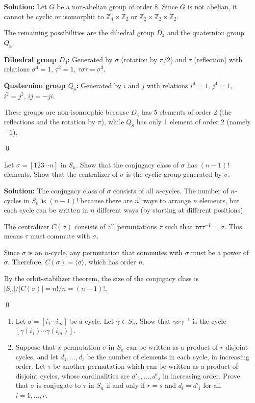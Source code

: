 \noindent\textbf{Solution:} Let $G$ be a non-abelian group of order 8. Since $G$ is not abelian, it cannot be cyclic or isomorphic to $\mathbb{Z}_4 \times \mathbb{Z}_2$ or $\mathbb{Z}_2 \times \mathbb{Z}_2 \times \mathbb{Z}_2$.

The remaining possibilities are the dihedral group $D_4$ and the quaternion group $Q_8$.

\textbf{Dihedral group $D_4$:} Generated by $\sigma$ (rotation by $\pi/2$) and $\tau$ (reflection) with relations $\sigma^4 = 1$, $\tau^2 = 1$, $\tau\sigma\tau = \sigma^3$.

\textbf{Quaternion group $Q_8$:} Generated by $i$ and $j$ with relations $i^4 = 1$, $j^4 = 1$, $i^2 = j^2$, $ij = -ji$.

These groups are non-isomorphic because $D_4$ has 5 elements of order 2 (the reflections and the rotation by $\pi$), while $Q_8$ has only 1 element of order 2 (namely $-1$).


\qed
\begin{problembox}
Let $\sigma = [123 \cdots n]$ in $S_n$. Show that the conjugacy class of $\sigma$ has $(n - 1)!$ elements. Show that the centralizer of $\sigma$ is the cyclic group generated by $\sigma$.
\end{problembox}

\noindent\textbf{Solution:} The conjugacy class of $\sigma$ consists of all $n$-cycles. The number of $n$-cycles in $S_n$ is $(n-1)!$ because there are $n!$ ways to arrange $n$ elements, but each cycle can be written in $n$ different ways (by starting at different positions).

The centralizer $C(\sigma)$ consists of all permutations $\tau$ such that $\tau\sigma\tau^{-1} = \sigma$. This means $\tau$ must commute with $\sigma$.

Since $\sigma$ is an $n$-cycle, any permutation that commutes with $\sigma$ must be a power of $\sigma$. Therefore, $C(\sigma) = \langle \sigma \rangle$, which has order $n$.

By the orbit-stabilizer theorem, the size of the conjugacy class is $|S_n|/|C(\sigma)| = n!/n = (n-1)!$.


\qed
\begin{problembox}
\begin{enumerate}[label=(\alph*)]
\item Let $\sigma = [i_1 \cdots i_m]$ be a cycle. Let $\gamma \in S_n$. Show that $\gamma\sigma\gamma^{-1}$ is the cycle $[\gamma(i_1) \cdots \gamma(i_m)]$.
\item Suppose that a permutation $\sigma$ in $S_n$ can be written as a product of $r$ disjoint cycles, and let $d_1, \ldots, d_r$ be the number of elements in each cycle, in increasing order. Let $\tau$ be another permutation which can be written as a product of disjoint cycles, whose cardinalities are $d'_1, \ldots, d'_s$ in increasing order. Prove that $\sigma$ is conjugate to $\tau$ in $S_n$ if and only if $r = s$ and $d_i = d'_i$ for all $i = 1, \ldots, r$.
\end{enumerate}
\end{problembox}

